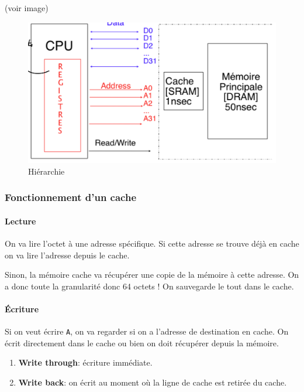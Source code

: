 (voir image)

\begin{figure}
\centering
\includegraphics{image-11.png}
\caption{Hiérarchie}
\end{figure}

\subsubsection{Fonctionnement d'un
cache}\label{fonctionnement-dun-cache}

\paragraph{Lecture}\label{lecture}

On va lire l'octet à une adresse spécifique. Si cette adresse se trouve
déjà en cache on va lire l'adresse depuis le cache.

Sinon, la mémoire cache va récupérer une copie de la mémoire à cette
adresse. On a donc toute la granularité donc 64 octets ! On sauvegarde
le tout dans le cache.

\paragraph{Écriture}\label{uxe9criture}

Si on veut écrire \texttt{A}, on va regarder si on a l'adresse de
destination en cache. On écrit directement dans le cache ou bien on doit
récupérer depuis la mémoire.

\begin{enumerate}
\def\labelenumi{\arabic{enumi}.}
\tightlist
\item
  \textbf{Write through}: écriture immédiate.
\item
  \textbf{Write back}: on écrit au moment où la ligne de cache est
  retirée du cache.
\end{enumerate}


